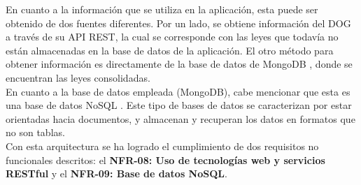 En cuanto a la información que se utiliza en la aplicación, esta puede ser obtenido de dos fuentes diferentes. Por un lado, se obtiene información del DOG a través de su API REST, la cual se corresponde con las leyes que todavía no están almacenadas en la base de datos de la aplicación. El otro método para obtener información es directamente de la base de datos de MongoDB \cite{mongodb}, donde se encuentran las leyes consolidadas.
\\

En cuanto a la base de datos empleada (MongoDB), cabe mencionar que esta es una base de datos NoSQL \cite{nosql}. Este tipo de bases de datos se caracterizan por estar orientadas hacia documentos, y almacenan y recuperan los datos en formatos que no son tablas.
\\

Con esta arquitectura se ha logrado el cumplimiento de dos requisitos no funcionales descritos: el {\bf NFR-08: Uso de tecnologías web y servicios RESTful} y el {\bf NFR-09: Base de datos NoSQL}.